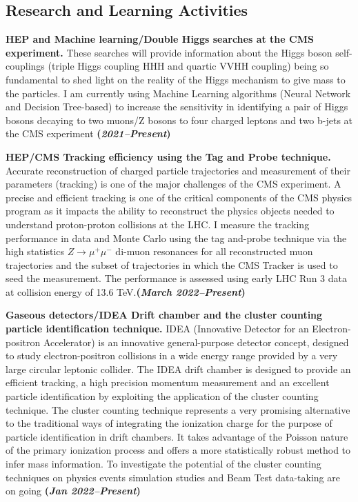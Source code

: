 \documentclass[11pt]{res}
\newcommand{\MarginText}[1]{\section{#1}\vspace{10pt}}
\begin{document}
\begin{resume}
\MarginText{Research and Learning Activities}

\textbf{HEP and Machine learning/Double Higgs searches at the CMS experiment.} These searches will provide information about the Higgs boson self-couplings (triple Higgs coupling HHH and quartic VVHH coupling) being so fundamental to shed light on the reality of the Higgs mechanism to give mass to the particles. I am currently using Machine Learning algorithms (Neural Network and Decision Tree-based) to increase the sensitivity in identifying a pair of Higgs bosons decaying to two muons/Z bosons to four charged leptons and two b-jets at the CMS experiment \textbf{(\textit{2021--Present})}

\textbf{HEP/CMS Tracking efficiency using the Tag and Probe technique.} Accurate reconstruction of charged particle trajectories and measurement of their parameters (tracking) is one of the major challenges of the CMS experiment. A precise and efficient tracking is one of the critical components of the CMS physics program as it impacts the ability to reconstruct the physics objects needed to understand proton-proton collisions at the LHC. I measure the tracking performance in data and Monte Carlo using the tag and-probe technique via the high statistics $Z\to \mu^{+} \mu^{-}$ di-muon resonances for all reconstructed muon trajectories and the subset of trajectories in which the CMS Tracker is used to seed the measurement. The performance is assessed using early LHC Run 3 data at collision energy of 13.6 TeV.\textbf{(\textit{March 2022--Present})}

\textbf{Gaseous detectors/IDEA Drift chamber and the cluster counting particle identification technique.} 
IDEA (Innovative Detector for an Electron-positron Accelerator) is an innovative general-purpose detector concept, designed to study electron-positron collisions in a wide energy range provided by a very large circular leptonic collider. The IDEA drift chamber is designed to provide an efficient tracking, a high precision momentum measurement and an excellent particle identification by exploiting the application of the cluster counting technique. The cluster counting technique represents a very promising alternative to the traditional ways of integrating the ionization charge for the purpose of particle identification in drift chambers. It takes advantage of the Poisson nature of the primary ionization process and offers a more statistically robust method to infer mass information. To investigate the potential of the cluster counting techniques on physics events simulation studies and Beam Test data-taking are on going \textbf{(\textit{Jan 2022--Present})}


\end{resume}
\end{document}
